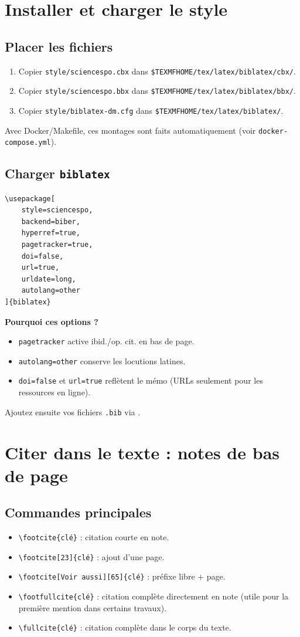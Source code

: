 \documentclass{article}
\begin{document}
\section{Installer et charger le style}

\subsection{Placer les fichiers}
\begin{enumerate}
	\item Copier \texttt{style/sciencespo.cbx} dans \texttt{\$TEXMFHOME/tex/latex/biblatex/cbx/}.
	\item Copier \texttt{style/sciencespo.bbx} dans \texttt{\$TEXMFHOME/tex/latex/biblatex/bbx/}.
	\item Copier \texttt{style/biblatex-dm.cfg} dans \texttt{\$TEXMFHOME/tex/latex/biblatex/}.
\end{enumerate}
Avec Docker/Makefile, ces montages sont faits automatiquement (voir \texttt{docker-compose.yml}).

\subsection{Charger \texttt{biblatex}}
\begin{verbatim}
\usepackage[
    style=sciencespo,
    backend=biber,
    hyperref=true,
    pagetracker=true,
    doi=false,
    url=true,
    urldate=long,
    autolang=other
]{biblatex}
\end{verbatim}
\textbf{Pourquoi ces options ?}
\begin{itemize}
	\item \texttt{pagetracker} active ibid./op. cit. en bas de page.
	\item \texttt{autolang=other} conserve les locutions latines.
	\item \texttt{doi=false} et \texttt{url=true} reflètent le mémo (URLs seulement pour les ressources en ligne).
\end{itemize}
Ajoutez ensuite vos fichiers \texttt{.bib} via \verb||.

\section{Citer dans le texte : notes de bas de page}

\subsection{Commandes principales}
\begin{itemize}
	\item \verb|\footcite{clé}| : citation courte en note.
	\item \verb|\footcite[23]{clé}| : ajout d'une page.
	\item \verb|\footcite[Voir aussi][65]{clé}| : préfixe libre + page.
	\item \verb|\footfullcite{clé}| : citation complète directement en note (utile pour la première mention dans certains travaux).
	\item \verb|\fullcite{clé}| : citation complète dans le corps du texte.
\end{itemize}
\end{document}
